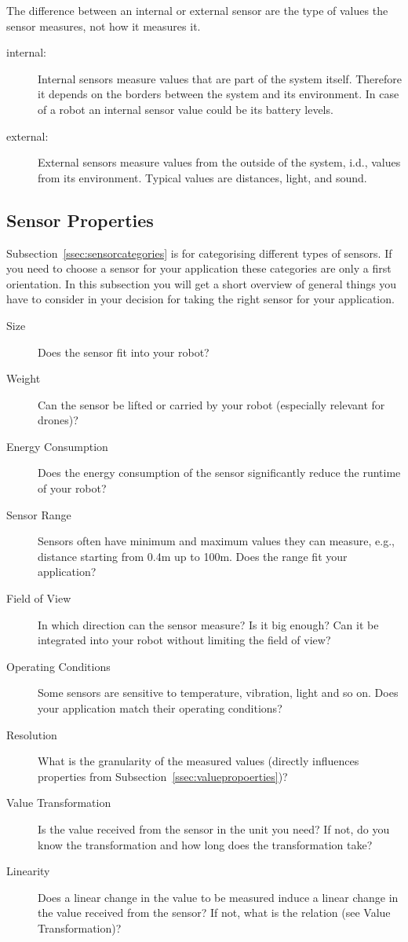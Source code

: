 The difference between an internal or external sensor are the type of values the sensor measures, not how it measures it.

\begin{description}
 \item [internal:] Internal sensors measure values that are part of the system itself. Therefore it depends on the borders between the system and its environment. In case of a robot an internal sensor value could be its battery levels.
 \item [external:] External sensors measure values from the outside of the system, i.d., values from its environment. Typical values are distances, light, and sound.
\end{description}

\subsection{Sensor Properties}
\label{ssec:sensorproperties}

Subsection~\ref{ssec:sensorcategories} is for categorising different types of sensors. If you need to choose a sensor for your application these categories are only a first orientation. In this subsection you will get a short overview of general things you have to consider in your decision for taking the right sensor for your application.

\begin{description}
 \item [Size] Does the sensor fit into your robot?
 \item [Weight] Can the sensor be lifted or carried by your robot (especially relevant for drones)?
 \item [Energy Consumption] Does the energy consumption of the sensor significantly reduce the runtime of your robot?
 \item [Sensor Range] Sensors often have minimum and maximum values they can measure, e.g., distance starting from 0.4m up to 100m. Does the range fit your application?
 \item [Field of View] In which direction can the sensor measure? Is it big enough? Can it be integrated into your robot without limiting the field of view?
 \item [Operating Conditions] Some sensors are sensitive to temperature, vibration, light and so on. Does your application match their operating conditions?
 \item [Resolution] What is the granularity of the measured values (directly influences properties from Subsection~\ref{ssec:valuepropoerties})?
 \item [Value Transformation] Is the value received from the sensor in the unit you need? If not, do you know the transformation and how long does the transformation take?
 \item [Linearity] Does a linear change in the value to be measured induce a linear change in the value received from the sensor? If not, what is the relation (see Value Transformation)?
\end{description}

